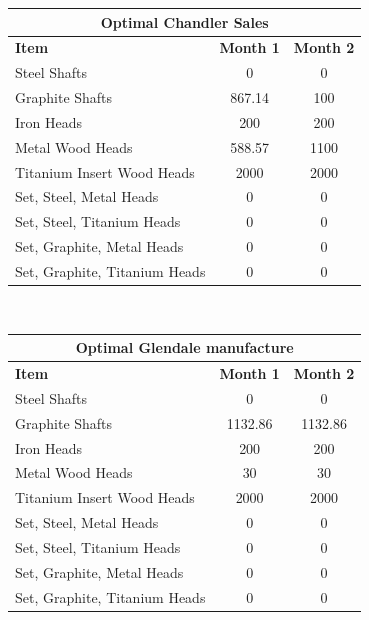 \documentclass[12pt]{article}
\begin{document}
\noindent
\begin{center}
\begin{tabular}{ l c c }
\hline
\multicolumn{3}{c}{Optimal Chandler Sales} \\
\hline
\textbf{Item} & \textbf{Month 1} & \textbf{Month 2} \\
Steel Shafts & 0 & 0 \\
Graphite Shafts & 867.14 & 100 \\
Iron Heads & 200 &200 \\
Metal Wood Heads & 588.57 & 1100 \\
Titanium Insert Wood Heads & 2000 & 2000 \\
Set, Steel, Metal Heads & 0 & 0 \\
Set, Steel, Titanium Heads & 0 & 0 \\
Set, Graphite, Metal Heads & 0 & 0 \\
Set, Graphite, Titanium Heads & 0 & 0 \\
\hline
\end{tabular}
\vspace{5mm}
\\
\end{center}

\noindent
\begin{center}
\begin{tabular}{ l c c }
\hline
\multicolumn{3}{c}{Optimal Glendale manufacture} \\
\hline
\textbf{Item} & \textbf{Month 1} & \textbf{Month 2} \\
Steel Shafts & 0 & 0 \\
Graphite Shafts & 1132.86 & 1132.86 \\
Iron Heads & 200 & 200 \\
Metal Wood Heads & 30 & 30 \\
Titanium Insert Wood Heads & 2000 & 2000 \\
Set, Steel, Metal Heads & 0 & 0 \\
Set, Steel, Titanium Heads & 0 & 0 \\
Set, Graphite, Metal Heads & 0 & 0 \\
Set, Graphite, Titanium Heads & 0 & 0 \\
\hline
\end{tabular}
\vspace{5mm}
\\
\end{center}
\end{document}
